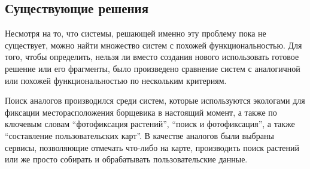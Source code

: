 \subsection{Существующие решения}

\tab
Несмотря на то, что системы, решающей именно эту проблему пока не существует, можно найти множество систем с похожей функциональностью.
Для того, чтобы определить, нельзя ли вместо создания нового использовать готовое решение или его фрагменты, было произведено сравнение систем с аналогичной или похожей функциональностью по нескольким критериям.

\nwln
Поиск аналогов производился среди систем, которые используются экологами для фиксации месторасположения борщевика в настоящий момент, а также по ключевым словам “фотофиксация растений”, “поиск и фотофиксация”, а также “составление пользовательских карт”.
В качестве аналогов были выбраны сервисы, позволяющие отмечать что-либо на карте, производить поиск растений или же просто собирать и обрабатывать пользовательские данные.

